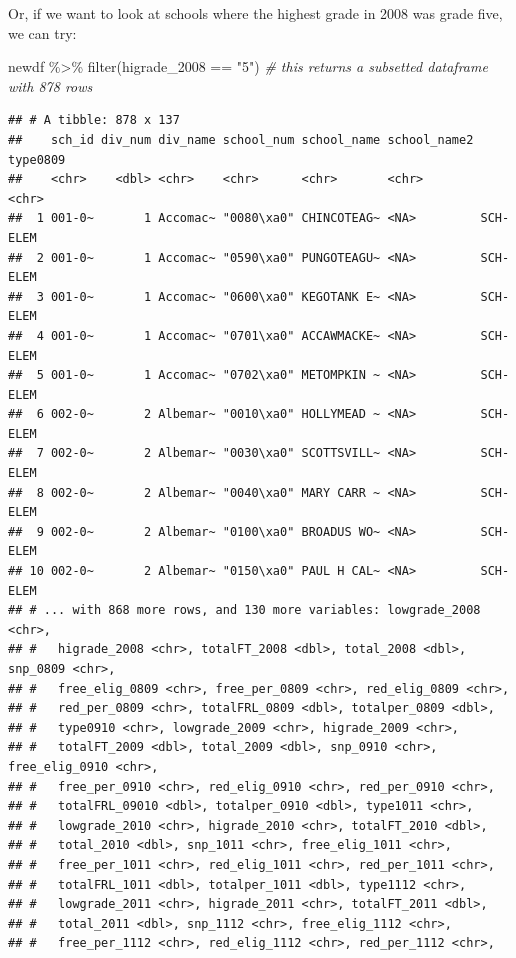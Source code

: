 \documentclass[
]{book}
\newenvironment{Shaded}{\begin{snugshade}}{\end{snugshade}}
\newcommand{\CommentTok}[1]{\textcolor[rgb]{0.56,0.35,0.01}{\textit{#1}}}
\newcommand{\FunctionTok}[1]{\textcolor[rgb]{0.00,0.00,0.00}{#1}}
\newcommand{\NormalTok}[1]{#1}
\newcommand{\SpecialCharTok}[1]{\textcolor[rgb]{0.00,0.00,0.00}{#1}}
\newcommand{\StringTok}[1]{\textcolor[rgb]{0.31,0.60,0.02}{#1}}
\begin{document}
Or, if we want to look at schools where the highest grade in 2008 was grade five, we can try:

\begin{Shaded}
\begin{Highlighting}[]
\NormalTok{newdf }\SpecialCharTok{\%\textgreater{}\%} \FunctionTok{filter}\NormalTok{(higrade\_2008 }\SpecialCharTok{==} \StringTok{"5"}\NormalTok{) }\CommentTok{\# this returns a subsetted dataframe with 878 rows}
\end{Highlighting}
\end{Shaded}

\begin{verbatim}
## # A tibble: 878 x 137
##    sch_id div_num div_name school_num school_name school_name2 type0809
##    <chr>    <dbl> <chr>    <chr>      <chr>       <chr>        <chr>   
##  1 001-0~       1 Accomac~ "0080\xa0" CHINCOTEAG~ <NA>         SCH-ELEM
##  2 001-0~       1 Accomac~ "0590\xa0" PUNGOTEAGU~ <NA>         SCH-ELEM
##  3 001-0~       1 Accomac~ "0600\xa0" KEGOTANK E~ <NA>         SCH-ELEM
##  4 001-0~       1 Accomac~ "0701\xa0" ACCAWMACKE~ <NA>         SCH-ELEM
##  5 001-0~       1 Accomac~ "0702\xa0" METOMPKIN ~ <NA>         SCH-ELEM
##  6 002-0~       2 Albemar~ "0010\xa0" HOLLYMEAD ~ <NA>         SCH-ELEM
##  7 002-0~       2 Albemar~ "0030\xa0" SCOTTSVILL~ <NA>         SCH-ELEM
##  8 002-0~       2 Albemar~ "0040\xa0" MARY CARR ~ <NA>         SCH-ELEM
##  9 002-0~       2 Albemar~ "0100\xa0" BROADUS WO~ <NA>         SCH-ELEM
## 10 002-0~       2 Albemar~ "0150\xa0" PAUL H CAL~ <NA>         SCH-ELEM
## # ... with 868 more rows, and 130 more variables: lowgrade_2008 <chr>,
## #   higrade_2008 <chr>, totalFT_2008 <dbl>, total_2008 <dbl>, snp_0809 <chr>,
## #   free_elig_0809 <chr>, free_per_0809 <chr>, red_elig_0809 <chr>,
## #   red_per_0809 <chr>, totalFRL_0809 <dbl>, totalper_0809 <dbl>,
## #   type0910 <chr>, lowgrade_2009 <chr>, higrade_2009 <chr>,
## #   totalFT_2009 <dbl>, total_2009 <dbl>, snp_0910 <chr>, free_elig_0910 <chr>,
## #   free_per_0910 <chr>, red_elig_0910 <chr>, red_per_0910 <chr>,
## #   totalFRL_09010 <dbl>, totalper_0910 <dbl>, type1011 <chr>,
## #   lowgrade_2010 <chr>, higrade_2010 <chr>, totalFT_2010 <dbl>,
## #   total_2010 <dbl>, snp_1011 <chr>, free_elig_1011 <chr>,
## #   free_per_1011 <chr>, red_elig_1011 <chr>, red_per_1011 <chr>,
## #   totalFRL_1011 <dbl>, totalper_1011 <dbl>, type1112 <chr>,
## #   lowgrade_2011 <chr>, higrade_2011 <chr>, totalFT_2011 <dbl>,
## #   total_2011 <dbl>, snp_1112 <chr>, free_elig_1112 <chr>,
## #   free_per_1112 <chr>, red_elig_1112 <chr>, red_per_1112 <chr>,

\end{verbatim}
\end{document}
